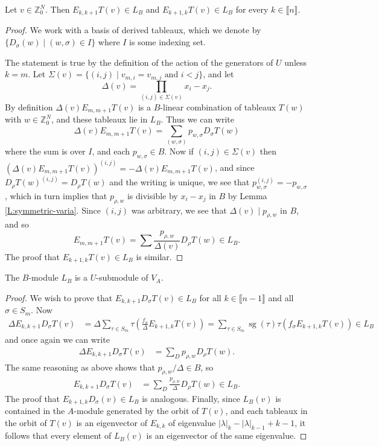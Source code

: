 \documentclass[11pt,fleqn]{article}
\newcommand\ZZ{\mathbb Z}
\renewcommand\ll{\llbracket}
\newcommand\rr{\rrbracket}
\DeclareMathOperator\sg{sg}
\begin{document}
\begin{Lemma}
Let $v\in \ZZ^N_0$. Then $E_{k,k+1} T(v) \in L_B$ and $E_{k+1,k}T(v) \in L_B$
for every $k \in \ll n \rr$.
\end{Lemma}
\begin{proof}
We work with a basis of derived tableaux, which we denote by $\{D_\sigma(w)
\mid (w, \sigma) \in I\}$ where $I$ is some indexing set.

The statement is true by the definition of the action of the generators of $U$
unless $k = m$. Let $\Sigma(v) = \{(i,j) \mid v_{m,i} = v_{m,j} \mbox{ and } 
i <j\}$, and let
\[
	\Delta(v) = \prod_{(i,j) \in \Sigma(v)} x_i - x_j.
\]
By definition $\Delta(v) E_{m,m+1} T(v)$ is a $B$-linear combination of 
tableaux $T(w)$ with $w \in \ZZ^N_0$, and these tableaux lie in $L_B$. Thus we 
can write
\[
\Delta(v) E_{m,m+1} T(v)
	= \sum_{(w,\sigma)} p_{w,\sigma} D_\sigma T(w)
\]
where the sum is over $I$, and each $p_{w, \sigma} \in B$. Now if $(i,j) \in 
\Sigma(v)$ then $(\Delta(v) E_{m,m+1} T(v))^{(i,j)}= - \Delta(v) E_{m,m+1} 
T(v)$, and since $D_\rho T(w)^{(i,j)} = D_\rho T(w)$ and the writing is 
unique, we see that $p_{w, \sigma}^{(i,j)} = - p_{w, \sigma}$, which in turn 
implies that $p_{\rho,w}$ is divisible by $x_i - x_j$ in $B$ by Lemma 
\ref{L:symmetric-varia}. Since $(i,j)$ was arbitrary, we see that $\Delta(v) 
\mid p_{\rho,w}$ in $B$, and so
\[
E_{m,m+1} T(v)
	= \sum \frac{p_{\rho, w}}{\Delta(v) } D_\rho T(w) \in L_B.
\]
The proof that $E_{k+1,k} T(v) \in L_B$ is similar.
\end{proof}


\begin{Proposition*}
The $B$-module $L_B$ is a $U$-submodule of $V_A$.
\end{Proposition*}
\begin{proof}
We wish to prove that $E_{k,k+1} D_\sigma T(v) \in L_B$ for all $k \in
\ll n-1 \rr$ and all $\sigma \in S_m$. Now
\begin{align*}
\Delta E_{k,k+1} D_\sigma T(v)
	&= \Delta \sum_{\tau \in S_m} \tau \left( 
		\frac{f_\sigma}{\Delta} E_{k+1,k} T(v)
	\right)
	= \sum_{\tau \in S_m} \sg(\tau) \tau \left( 
		f_\sigma E_{k+1,k} T(v)
			\right) \in L_B
\end{align*}
and once again we can write
\begin{align*}
\Delta E_{k,k+1} D_\sigma T(v)
	&= \sum_{D} p_{\rho, w} D_{\rho} T(w).
\end{align*}
The same reasoning as above shows that $p_{\rho,w}/\Delta \in B$, so
\begin{align*}
E_{k,k+1} D_\sigma T(v)
	&= \sum_{D} \frac{p_{\rho, w}}{\Delta} D_{\rho} T(w) \in L_B.
\end{align*}
The proof that $E_{k+1,k} D_\sigma (v) \in L_B$ is analogous. Finally,
since $L_B(v)$ is contained in the $A$-module generated by the orbit
of $T(v)$, and each tableaux in the orbit of $T(v)$ is an eigenvector of
$E_{k,k}$ of eigenvalue $|\lambda|_k - |\lambda|_{k-1} + k-1$, it follows
that every element of $L_B(v)$ is an eigenvector of the same eigenvalue.
\end{proof}
\end{document}
